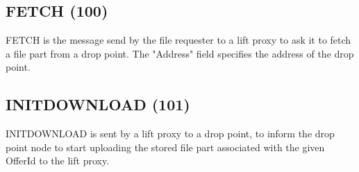\begin{figure}[H]
    \centering
\end{figure}

\subsection{FETCH (100)}

FETCH is the message send by the file requester to a lift proxy to ask it to
fetch a file part from a drop point. The "Address" field specifies the address
of the drop point.

\begin{figure}[H]
    \centering
\end{figure}

\subsection{INITDOWNLOAD (101)}

INITDOWNLOAD is sent by a lift proxy to a drop point, to inform the drop point
node to start uploading the stored file part associated with the given OfferId
to the lift proxy.

\begin{figure}[H]
    \centering
\end{figure}
